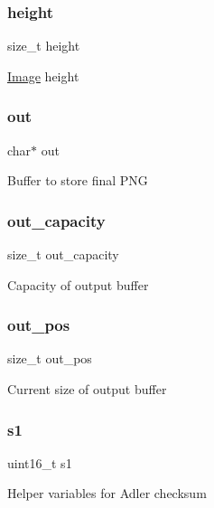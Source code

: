 \subsubsection{\texorpdfstring{height}{height}}
{\footnotesize\ttfamily size\+\_\+t height}

\hyperlink{struct_image}{Image} height \mbox{\label{structpng__t_a392d7ef877b6258e64850ce3a2647dae}} 
\subsubsection{\texorpdfstring{out}{out}}
{\footnotesize\ttfamily char$\ast$ out}

Buffer to store final P\+NG \mbox{\label{structpng__t_ac8fcf2b31db62e2bfeb7c2ee10b39908}} 
\subsubsection{\texorpdfstring{out\+\_\+capacity}{out\_capacity}}
{\footnotesize\ttfamily size\+\_\+t out\+\_\+capacity}

Capacity of output buffer \mbox{\label{structpng__t_ac8ef22a87f97ef02768e0faedea1307d}} 
\subsubsection{\texorpdfstring{out\+\_\+pos}{out\_pos}}
{\footnotesize\ttfamily size\+\_\+t out\+\_\+pos}

Current size of output buffer \mbox{\label{structpng__t_a90256a2c1ea2d035ef0a2b87e543bcb8}} 
\subsubsection{\texorpdfstring{s1}{s1}}
{\footnotesize\ttfamily uint16\+\_\+t s1}

Helper variables for Adler checksum \mbox{\label{structpng__t_a95ac0a163ca4077eac153ae972bfae9f}} 
